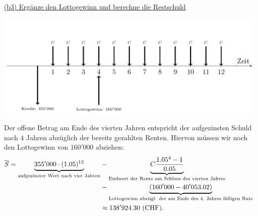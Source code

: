 \underline{(b3) Ergänze den Lottogewinn und berechne die Restschuld}\\
\begin{center}
	\includegraphics[scale=0.55]{pictures/zeitstrahl_1_b_filled_2}
\end{center}
Der offene Betrag am Ende  des vierten Jahren entspricht der aufgezinsten Schuld nach $ 4 $ Jahren abzüglich der bereits gezahlten Renten.
Hiervon müssen wir noch den Lottogewinn von $ 160'000 $ abziehen:
\begin{align*}
	\overline{S}
	=
	\underbrace{355'000 \cdot (1.05)^{12}}_{\textrm{aufgezinster Wert nach vier Jahren} }
	&-
	\underbrace{C\frac{1.05^4 - 1}{0.05}}_{\textrm{Endwert der Rente am Schluss des vierten Jahres}}\\
	&-\underbrace{(160'000 -40'053.02 ) }_{\textrm{Lottogewinn abzügl. der am Ende des $ 4. $ Jahres fälligen Rate}}\\
	&\approx 
	138'924.30 \ \mathrm{(CHF)}.
\end{align*}

